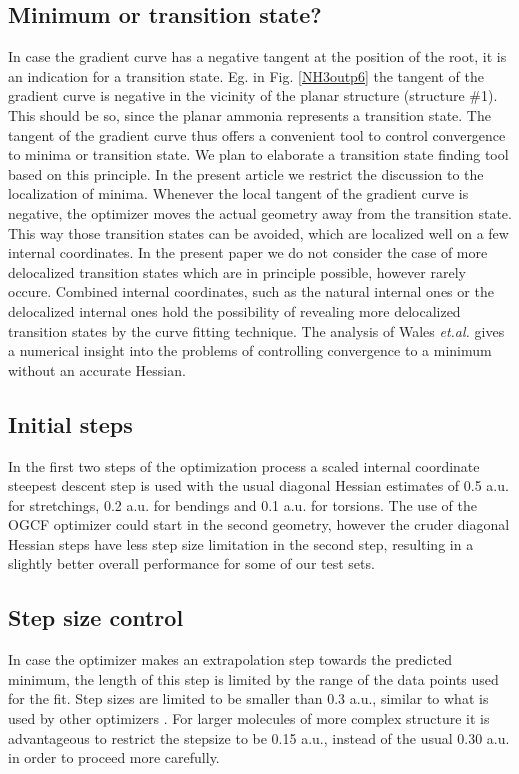 \documentclass[prl,aps,twocolumn,showpacs,twocolumngrid,superbib]{revtex4}
\begin{document}
\subsection{Minimum or transition state?}
In case the gradient curve has a negative tangent at the position
of the root, it is an indication for a transition state. 
Eg. in Fig. \ref{NH3outp6} the tangent of the gradient curve 
is negative in the vicinity of the planar
structure (structure \#1). This should be so, since the planar
ammonia represents a transition state. The tangent of the gradient 
curve thus offers a
convenient tool to control convergence to minima or transition state.
We plan to elaborate a transition state finding tool based on this 
principle. In the present article we restrict the discussion
to the localization of minima. Whenever the local tangent  
of the gradient curve
is negative, the optimizer moves the actual geometry away from 
the transition state. This way those transition states 
can be avoided, which are localized well on a few internal coordinates. 
In the present paper we do not consider the case of more 
delocalized transition states which are in principle possible,
however rarely occure. Combined internal coordinates, such
as the natural internal ones \cite{Pulay_natural_internals} or the
delocalized internal ones \cite{Baker_deloc_1} hold the possibility
of revealing more delocalized transition states by the
curve fitting technique. The analysis of Wales {\it et.al.} 
\cite{Wales_saddlepoint}
gives a numerical insight into the problems of controlling
convergence to a minimum without an accurate Hessian.

\subsection{Initial steps}
In the first two steps of the optimization
process a scaled internal coordinate steepest descent step is used
with the usual diagonal Hessian estimates of
0.5 a.u. for stretchings, 0.2 a.u. for bendings and 0.1 a.u.
for torsions. The use of the OGCF optimizer could start in the
second geometry, however the cruder diagonal Hessian steps have less
step size limitation in the second step, resulting in a slightly
better overall performance for some of our test sets.

\subsection{Step size control}
In case the optimizer makes an extrapolation step towards the predicted
minimum, the length of this step is limited by the range of the
data points used for the fit. Step sizes are limited to be smaller
than 0.3 a.u., similar to what is used by other optimizers 
\cite{eckert}.
For larger molecules of more complex structure 
it is advantageous to restrict
the stepsize to be 0.15 a.u., instead of the usual 0.30 a.u. 
in order to proceed more carefully.
\end{document}
